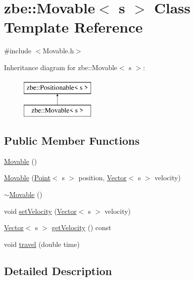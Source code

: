 \hypertarget{classzbe_1_1_movable}{}\section{zbe\+:\+:Movable$<$ s $>$ Class Template Reference}
\label{classzbe_1_1_movable}


{\ttfamily \#include $<$Movable.\+h$>$}

Inheritance diagram for zbe\+:\+:Movable$<$ s $>$\+:\begin{figure}[H]
\begin{center}
\leavevmode
\includegraphics[height=2.000000cm]{classzbe_1_1_movable}
\end{center}
\end{figure}
\subsection*{Public Member Functions}
\begin{DoxyCompactItemize}
\item 
\hyperlink{classzbe_1_1_movable_a391fb1a17f6ff316f9eecdc227e4e7eb}{Movable} ()
\item 
\hyperlink{classzbe_1_1_movable_a38f9dba0d0c33b602f01ac04384afaa7}{Movable} (\hyperlink{classzbe_1_1_point}{Point}$<$ s $>$ position, \hyperlink{classzbe_1_1_vector}{Vector}$<$ s $>$ velocity)
\item 
\hyperlink{classzbe_1_1_movable_a025828ff1b377cf7c4ab463ef8e598ec}{$\sim$\+Movable} ()
\item 
void \hyperlink{classzbe_1_1_movable_aae95d27a429d37f03d5e9a99d30f9fd8}{set\+Velocity} (\hyperlink{classzbe_1_1_vector}{Vector}$<$ s $>$ velocity)
\item 
\hyperlink{classzbe_1_1_vector}{Vector}$<$ s $>$ \hyperlink{classzbe_1_1_movable_a197edd5f791cba551b8465df6bf6e8fb}{get\+Velocity} () const 
\item 
void \hyperlink{classzbe_1_1_movable_a55b00e940046a32fcc24f2fa8847db67}{travel} (double time)
\end{DoxyCompactItemize}


\subsection{Detailed Description}
